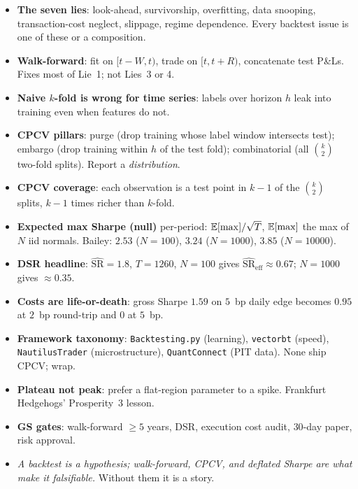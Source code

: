 \begin{itemize}
  \item \textbf{The seven lies}: look-ahead, survivorship,
  overfitting, data snooping, transaction-cost neglect,
  slippage, regime dependence. Every backtest issue is one of
  these or a composition.
  \item \textbf{Walk-forward}: fit on $[t-W, t)$, trade on
  $[t, t+R)$, concatenate test P\&Ls. Fixes most of Lie~1;
  not Lies~3 or 4.
  \item \textbf{Naive $k$-fold is wrong for time series}:
  labels over horizon $h$ leak into training even when
  features do not.
  \item \textbf{CPCV pillars}: purge (drop training whose
  label window intersects test); embargo (drop training
  within $h$ of the test fold); combinatorial (all
  $\binom{k}{2}$ two-fold splits). Report a
  \emph{distribution}.
  \item \textbf{CPCV coverage}: each observation is a test
  point in $k - 1$ of the $\binom{k}{2}$ splits, $k - 1$
  times richer than $k$-fold.
  \item \textbf{Expected max Sharpe (null)} per-period:
  $\mathbb{E}[\max]/\sqrt{T}$, $\mathbb{E}[\max]$ the max of $N$ iid
  normals. Bailey: $2.53$ ($N=100$), $3.24$ ($N=1000$),
  $3.85$ ($N=10000$).
  \item \textbf{DSR headline}: $\widehat{\text{SR}} = 1.8$,
  $T = 1260$, $N = 100$ gives $\widehat{\text{SR}}_{\text{eff}}
  \approx 0.67$; $N = 1000$ gives $\approx 0.35$.
  \item \textbf{Costs are life-or-death}: gross Sharpe $1.59$
  on $5$~bp daily edge becomes $0.95$ at $2$~bp round-trip
  and $0$ at $5$~bp.
  \item \textbf{Framework taxonomy}: \texttt{Backtesting.py}
  (learning), \texttt{vectorbt} (speed),
  \texttt{NautilusTrader} (microstructure),
  \texttt{QuantConnect} (PIT data). None ship CPCV; wrap.
  \item \textbf{Plateau not peak}: prefer a flat-region
  parameter to a spike. Frankfurt Hedgehogs' Prosperity~3
  lesson.
  \item \textbf{GS gates}: walk-forward $\geq 5$ years,
  DSR, execution cost audit, $30$-day paper, risk approval.
  \item \emph{A backtest is a hypothesis; walk-forward, CPCV,
  and deflated Sharpe are what make it falsifiable.} Without
  them it is a story.
\end{itemize}
